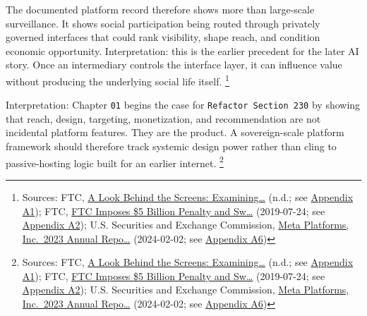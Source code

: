 \documentclass[
  american,
  11pt,
  letterpaper,
]{article}
\begin{document}
The documented platform record therefore shows more than large-scale
surveillance. It shows social participation being routed through
privately governed interfaces that could rank visibility, shape reach,
and condition economic opportunity. Interpretation: this is the earlier
precedent for the later AI story. Once an intermediary controls the
interface layer, it can influence value without producing the underlying
social life itself. \footnote{Sources: FTC,
  \href{https://www.ftc.gov/reports/look-behind-screens-examining-data-practices-social-media-video-streaming-services}{A
  Look Behind the Screens: Examining\ldots{}} (n.d.; see
  \hyperref[ch-01-appendix-a1-a-look-behind-the-screens-examining-the-data-practices-of-social-media-and-video-streaming-services]{Appendix
  A1}); FTC,
  \href{https://www.ftc.gov/news-events/news/press-releases/2019/07/ftc-imposes-5-billion-penalty-sweeping-new-privacy-restrictions-facebook}{FTC
  Imposes \$5 Billion Penalty and Sw\ldots{}} (2019-07-24; see
  \hyperref[ch-01-appendix-a2-ftc-imposes-5-billion-penalty-and-sweeping-new-privacy-restrictions-on-facebook]{Appendix
  A2}); U.S. Securities and Exchange Commission,
  \href{https://www.sec.gov/Archives/edgar/data/1326801/000132680124000012/meta-20231231.htm}{Meta
  Platforms, Inc.~2023 Annual Repo\ldots{}} (2024-02-02; see
  \hyperref[ch-01-appendix-a6-meta-platforms-inc-2023-annual-report-form-10-k]{Appendix
  A6})}

Interpretation: Chapter \texttt{01} begins the case for
\texttt{Refactor\ Section\ 230} by showing that reach, design,
targeting, monetization, and recommendation are not incidental platform
features. They are the product. A sovereign-scale platform framework
should therefore track systemic design power rather than cling to
passive-hosting logic built for an earlier internet. \footnote{Sources:
  FTC,
  \href{https://www.ftc.gov/reports/look-behind-screens-examining-data-practices-social-media-video-streaming-services}{A
  Look Behind the Screens: Examining\ldots{}} (n.d.; see
  \hyperref[ch-01-appendix-a1-a-look-behind-the-screens-examining-the-data-practices-of-social-media-and-video-streaming-services]{Appendix
  A1}); FTC,
  \href{https://www.ftc.gov/news-events/news/press-releases/2019/07/ftc-imposes-5-billion-penalty-sweeping-new-privacy-restrictions-facebook}{FTC
  Imposes \$5 Billion Penalty and Sw\ldots{}} (2019-07-24; see
  \hyperref[ch-01-appendix-a2-ftc-imposes-5-billion-penalty-and-sweeping-new-privacy-restrictions-on-facebook]{Appendix
  A2}); U.S. Securities and Exchange Commission,
  \href{https://www.sec.gov/Archives/edgar/data/1326801/000132680124000012/meta-20231231.htm}{Meta
  Platforms, Inc.~2023 Annual Repo\ldots{}} (2024-02-02; see
  \hyperref[ch-01-appendix-a6-meta-platforms-inc-2023-annual-report-form-10-k]{Appendix
  A6})}
\end{document}
